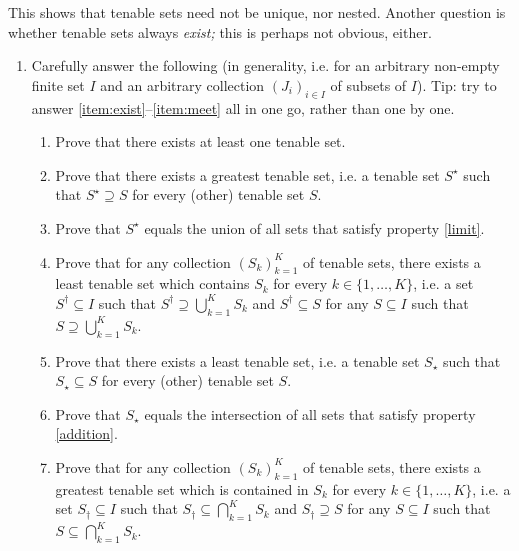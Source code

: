 \begin{exercise}
\begin{enumerate}[label=(\alph*)]
	\end{enumerate}

	This shows that tenable sets need not be unique, nor nested. Another question is whether tenable sets always \emph{exist;} this is perhaps not obvious, either.

	\begin{enumerate}[label=(\alph*),resume]

		\item Carefully answer the following (in generality, i.e. for an arbitrary non-empty finite set $I$ and an arbitrary collection $(J_i)_{i \in I}$ of subsets of $I$). Tip: try to answer \ref{item:exist}--\ref{item:meet} all in one go, rather than one by one.

		\begin{enumerate}[label=(\roman*)]
		
			\item \label{item:exist} Prove that there exists at least one tenable set.

			\item \label{item:greatest} Prove that there exists a greatest tenable set, i.e. a tenable set $S^\star$ such that $S^\star \supseteq S$ for every (other) tenable set $S$.

			\item \label{item:union} Prove that $S^\star$ equals the union of all sets that satisfy property \ref{limit}.

			\item \label{item:join} Prove that for any collection $(S_k)_{k=1}^K$ of tenable sets, there exists a least tenable set which contains $S_k$ for every $k \in \{1,\dots,K\}$, i.e. a set $S^\dag \subseteq I$ such that $S^\dag \supseteq \bigcup_{k=1}^K S_k$ and $S^\dag \subseteq S$ for any $S \subseteq I$ such that $S \supseteq \bigcup_{k=1}^K S_k$.

			\item \label{item:least} Prove that there exists a least tenable set, i.e. a tenable set $S_\star$ such that $S_\star \subseteq S$ for every (other) tenable set $S$.

			\item \label{item:intersect} Prove that $S_\star$ equals the intersection of all sets that satisfy property \ref{addition}.

			\item \label{item:meet} Prove that for any collection $(S_k)_{k=1}^K$ of tenable sets, there exists a greatest tenable set which is contained in $S_k$ for every $k \in \{1,\dots,K\}$, i.e. a set $S_\dag \subseteq I$ such that $S_\dag \subseteq \bigcap_{k=1}^K S_k$ and $S_\dag \supseteq S$ for any $S \subseteq I$ such that $S \subseteq \bigcap_{k=1}^K S_k$.


\end{enumerate}
\end{enumerate}
\end{exercise}
